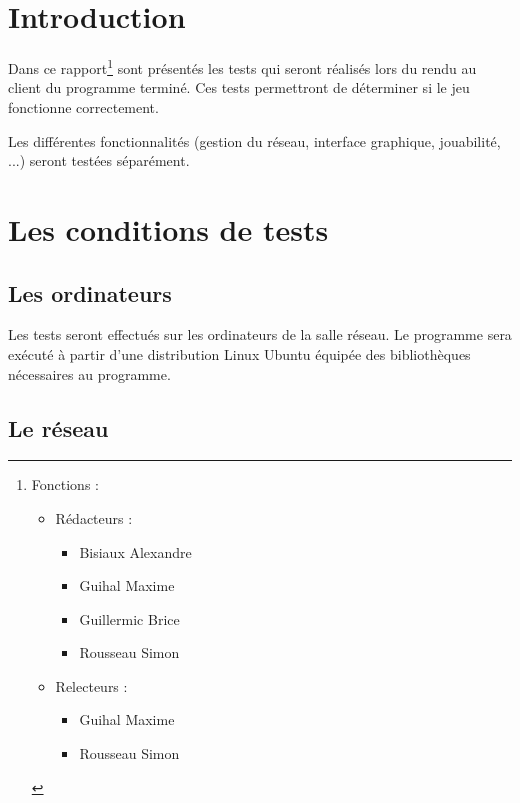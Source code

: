 \section*{Introduction}

Dans ce rapport\footnote{Fonctions :
\begin{itemize}
 \item Rédacteurs :
\begin{itemize}
 \item Bisiaux Alexandre
  \item Guihal Maxime
\item Guillermic Brice
\item Rousseau Simon
\end{itemize}
\item Relecteurs :
\begin{itemize}
 \item Guihal Maxime
\item Rousseau Simon
\end{itemize}
\end{itemize}
} sont présentés les tests qui seront réalisés lors du rendu au client du programme terminé. Ces tests permettront de déterminer si le jeu fonctionne correctement.

\vspace{0.5cm}

Les différentes fonctionnalités (gestion du réseau, interface graphique, jouabilité, ...) seront testées séparément.

\newpage

\section{Les conditions de tests}


\subsection{Les ordinateurs}

Les tests seront effectués sur les ordinateurs de la salle réseau. Le programme sera exécuté à partir d'une distribution Linux Ubuntu équipée des bibliothèques nécessaires au programme.

\subsection{Le réseau}

